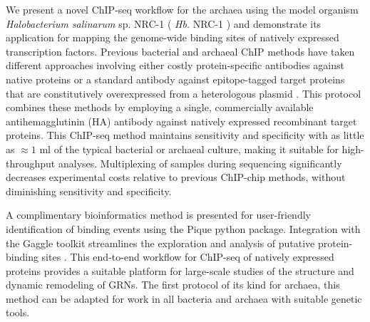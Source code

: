 We present a novel ChIP-seq workflow for the archaea using the model organism {\em Halobacterium salinarum} sp. NRC-1 ( {\em Hb.} NRC-1 ) and demonstrate its application for mapping the genome-wide binding sites of natively expressed transcription factors. Previous bacterial and archaeal ChIP methods have taken different approaches involving either costly protein-specific antibodies against native proteins \cite{lun_blind_2009} or a standard antibody against epitope-tagged target proteins that are constitutively overexpressed from a heterologous plasmid \cite{facciotti_general_2007, kaur_coordination_2010}. This protocol combines these methods by employing a single, commercially available antihemagglutinin (HA) antibody against natively expressed recombinant target proteins. This ChIP-seq method maintains sensitivity and specificity with as little as $\approx 1$ ml of the typical bacterial or archaeal culture, making it suitable for high-throughput analyses. Multiplexing of samples during sequencing significantly decreases experimental costs relative to previous ChIP-chip methods, without diminishing sensitivity and specificity.

A complimentary bioinformatics method is presented for user-friendly identification of binding events using the Pique python package. Integration with the Gaggle toolkit streamlines the exploration and analysis of putative protein-binding sites \cite{bare_integration_2010, shannon2006gaggle}. This end-to-end workflow for ChIP-seq of natively expressed proteins provides a suitable platform for large-scale studies of the structure and dynamic remodeling of GRNs. The first protocol of its kind for archaea, this method can be adapted for work in all bacteria and archaea with suitable genetic tools.
